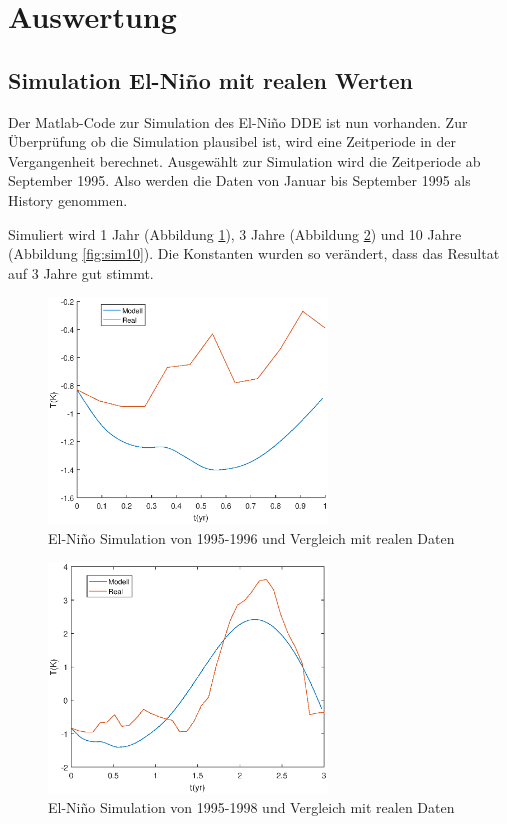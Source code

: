 \section{Auswertung}
\subsection{Simulation El-Niño mit realen Werten}
Der Matlab-Code zur Simulation des El-Niño DDE ist nun vorhanden.
Zur Überprüfung ob die Simulation plausibel ist, wird eine Zeitperiode in der Vergangenheit berechnet.
Ausgewählt zur Simulation wird die Zeitperiode ab September 1995. 
Also werden die Daten von Januar bis September 1995 als History genommen.

Simuliert wird 1 Jahr (Abbildung \ref{fig:sim1}), 3 Jahre (Abbildung \ref{fig:sim3}) und 10 Jahre (Abbildung \ref{fig:sim10}). 
Die Konstanten wurden so verändert, dass das Resultat auf 3 Jahre gut stimmt.
\begin{figure}
	\centering
	\includegraphics[width=0.66\textwidth,height=0.33\textheight]{verzoegert/inp/figures/sim_1.eps}
	\caption{El-Niño Simulation von 1995-1996 und Vergleich mit realen Daten}
	\label{fig:sim1}
\end{figure}
\begin{figure}
	\centering
	\includegraphics[width=0.66\textwidth,height=0.33\textheight]{verzoegert/inp/figures/sim_3.eps}
	\caption{El-Niño Simulation von 1995-1998 und Vergleich mit realen Daten}
	\label{fig:sim3}
\end{figure}
